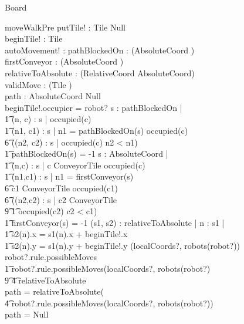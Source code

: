 \begin{class}{Board}
\begin{schema}{moveWalkPre}
putTile! : Tile \cup Null \\
beginTile! : Tile \\
autoMovement! : \bool
\also \also \also
pathBlockedOn : \power (\seq AbsoluteCoord \fun \nat) \\
firstConveyor : \power (\seq AbsoluteCoord \fun \nat) \\
relativeToAbsolute : \power (\seq RelativeCoord \pfun \seq AbsoluteCoord) \\
validMove : \power (Tile \fun \bool) \\
path : \power \seq AbsoluteCoord \cup Null \\
\where
beginTile!.occupier = robot?
\also \also \also \also
\forall s : \power \seq pathBlockedOn | \\ \t1
 \IF \exists (n, c) : s | occupied(c) \\ \t1
 \THEN \exists (n1, c1) : s | n1 = pathBlockedOn(s) \wedge occupied(c) \; \; \wedge \\ \t6
 (\neg \exists (n2, c2) : s | occupied(c) \wedge n2 < n1) \\ \t1
 \ELSE pathBlockedOn(s) = -1
\also \also \also \also
\forall s : \power \seq AbsoluteCoord | \\ \t1
 \IF \exists (n,c) : s | c \in ConveyorTile \wedge \neg occupied(c) \\ \t1
 \THEN \exists (n1,c1) : s | n1 = firstConveyor(s) \; \; \wedge \\ \t6 c1 \in ConveyorTile \wedge \neg occupied(c1) \; \; \wedge \\ \t6
 (\neg \exists (n2,c2) : s | c2 \in ConveyorTile \; \; \wedge \\ \t9 \t1 \neg occupied(c2) \wedge c2 < c1) \\ \t1
 \ELSE firstConveyor(s) = -1
\also \also \also \also
\forall (s1, s2) : relativeToAbsolute | \forall n : \dom s1 | \\ \t1 s2(n).x = s1(n).x + beginTile!.x \; \; \wedge \\ \t1 s2(n).y = s1(n).y + beginTile!.y
\also \also \also \also
\IF (localCoords?, robots(robot?)) \in robot?.rule.possibleMoves \; \; \wedge \\ \t1 robot?.rule.possibleMoves(localCoords?, robots(robot?) \in \\ \t9 \t4 relativeToAbsolute \\
\THEN path = relativeToAbsolute( \\ \t4 robot?.rule.possibleMoves(localCoords?, robots(robot?)) \\
\ELSE path = Null
\also \also \also \also

\end{schema}
\end{class}
